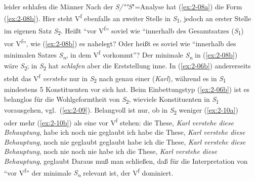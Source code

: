 \documentclass[output=paper]{langsci/langscibook}
\begin{document}
\eal
	\ex leider schlafen die Männer \label{ex:2-08a} 
	 \label{ex:2-08b}
\zl 
Nach der \textit{S/""S}"=Analyse hat (\ref{ex:2-08a}) die Form (\ref{ex:2-08b}). Hier steht V\textsuperscript{f} ebenfalls an zweiter Stelle in \textit{S}\textsubscript{1}, jedoch an erster Stelle im eigenen Satz \textit{S}\textsubscript{2}. Heißt "`vor V\textsuperscript{f}"' soviel wie "`innerhalb des Gesamtsatzes (\textit{S}\textsubscript{1}) vor V\textsuperscript{f}"', wie (\ref{ex:2-08b}) es nahelegt? Oder heißt es soviel wie "`innerhalb des minimalen Satzes \textit{S\textsubscript{n}}, in dem V\textsuperscript{f} vorkommt"'? Der minimale \textit{S\textsubscript{n}} in (\ref{ex:2-08b}) wäre \textit{S}\textsubscript{2}; in \textit{S}\textsubscript{2} hat \textit{schlafen} aber die Erststellung inne. In (\ref{ex:2-06b}) andererseits steht das V\textsuperscript{f} \textit{verstehe} nur in \textit{S}\textsubscript{2} nach genau einer  (\textit{Karl}), während es in \textit{S}\textsubscript{1} mindestens 5 Konstituenten vor sich hat. Beim Einbettungstyp (\ref{ex:2-06b}) ist es belanglos für die Wohlgeformtheit von \textit{S}\textsubscript{2}, wieviele Konstituenten in \textit{S}\textsubscript{1} vorausgehen, vgl.\ (\ref{ex:2-09}). Belangvoll ist nur, ob in \textit{S}\textsubscript{2} weniger (\ref{ex:2-10a}) oder mehr (\ref{ex:2-10b}) als eine  vor V\textsuperscript{f} stehen:
\eal \label{ex:2-09}
	\ex \label{ex:2-09a} die These, \textit{Karl verstehe diese Behauptung}, habe ich noch nie geglaubt
	\ex \label{ex:2-09b} ich habe die These, \textit{Karl verstehe diese Behauptung}, noch nie geglaubt
	\ex \label{ex:2-09c} geglaubt habe ich die These, \textit{Karl verstehe diese Behauptung}, noch nie
	\ex \label{ex:2-09d} noch nie habe ich die These, \textit{Karl verstehe diese Behauptung}, geglaubt
\zl
\eal \label{ex:2-10}
	 \label{ex:2-10a}
	 \label{ex:2-10b}
\zl 
Daraus muß man schließen, daß für die Interpretation von "`vor V\textsuperscript{f}"' der minimale \textit{S\textsubscript{n}} relevant ist, der V\textsuperscript{f} dominiert.
\end{document}
